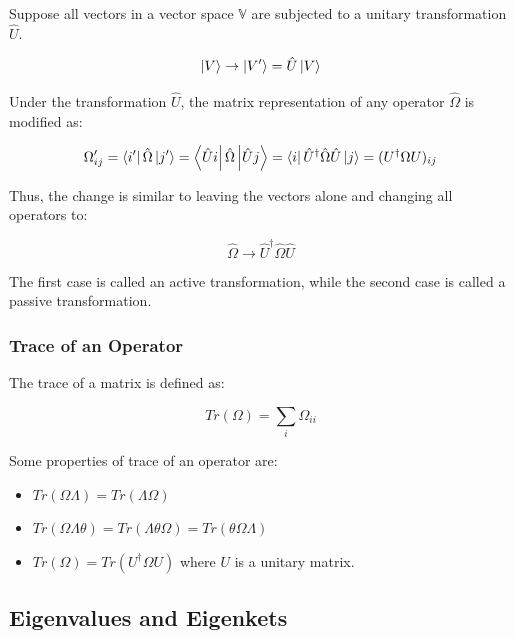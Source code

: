 \documentclass[12pt,a4paper]{report}
\newcommand{\vecspace}[1]{\mathbb{#1}}
\begin{document}
Suppose all vectors in a vector space $\vecspace{V}$ are subjected to a unitary transformation $\hat{U}$.

\begin{equation*}
    \ket{V} \rightarrow \ket{V'} = \hat{U}\ket{V}
\end{equation*}

Under the transformation $\hat{U}$, the matrix representation of any operator $\hat{\Omega}$ is modified as:

\begin{equation*}
    \Omega'_{ij} = \bra{i'}\hat{\Omega}\ket{j'} = \bra{\hat{U}i}\hat{\Omega}\ket{\hat{U}j} = \bra{i}\hat{U}^\dagger\hat{\Omega}\hat{U}\ket{j} = (U^\dagger\Omega U)_{ij}
\end{equation*}

Thus, the change is similar to leaving the vectors alone and changing all operators to:

\begin{equation*}
    \hat{\Omega} \rightarrow \hat{U}^\dagger\hat{\Omega}\hat{U}
\end{equation*}

The first case is called an active transformation, while the second case is called a passive transformation.

\subsubsection{Trace of an Operator}

The trace of a matrix is defined as:

\begin{equation*}
    Tr(\Omega) = \sum_i \Omega_{ii}
\end{equation*}

Some properties of trace of an operator are:

\begin{itemize}
    \item $Tr(\Omega\Lambda) = Tr(\Lambda\Omega)$
    \item $Tr(\Omega\Lambda\theta) = Tr(\Lambda\theta\Omega) = Tr(\theta\Omega\Lambda)$
    \item $Tr(\Omega) = Tr(U^\dagger\Omega U)$ where $U$ is a unitary matrix.
\end{itemize}

\subsection{Eigenvalues and Eigenkets}
\end{document}
